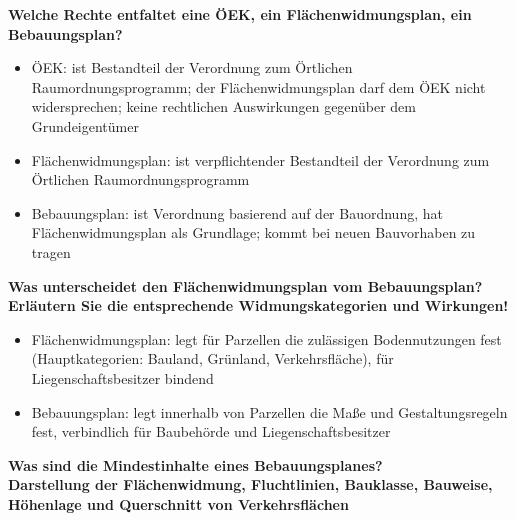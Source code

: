 \documentclass[]{article}
\newenvironment{question}{\vspace{8mm}\noindent\bfseries}{\\}
\begin{document}
\begin{question}
	Welche Rechte entfaltet eine ÖEK, ein Flächenwidmungsplan, ein Bebauungsplan?
\end{question}
\begin{itemize}
	\item ÖEK: ist Bestandteil der Verordnung zum Örtlichen Raumordnungsprogramm; der Flächenwidmungsplan darf dem ÖEK nicht widersprechen; keine rechtlichen Auswirkungen gegenüber dem Grundeigentümer
	\item Flächenwidmungsplan: ist verpflichtender Bestandteil der Verordnung zum Örtlichen Raumordnungsprogramm
	\item Bebauungsplan: ist Verordnung basierend auf der Bauordnung, hat Flächenwidmungsplan als Grundlage; kommt bei neuen Bauvorhaben zu tragen
\end{itemize}

\begin{question}
	Was unterscheidet den Flächenwidmungsplan vom Bebauungsplan? Erläutern Sie die entsprechende Widmungskategorien und Wirkungen!
\end{question}
\begin{itemize}
	\item Flächenwidmungsplan: legt für Parzellen die zulässigen Bodennutzungen fest (Hauptkategorien: Bauland, Grünland, Verkehrsfläche), für Liegenschaftsbesitzer bindend
	\item Bebauungsplan: legt innerhalb von Parzellen die Maße und Gestaltungsregeln fest, verbindlich für Baubehörde und Liegenschaftsbesitzer
\end{itemize}

\begin{question}
	Was sind die Mindestinhalte eines Bebauungsplanes?
\end{question}
Darstellung der Flächenwidmung, Fluchtlinien, Bauklasse, Bauweise, Höhenlage und Querschnitt von Verkehrsflächen
\end{document}
